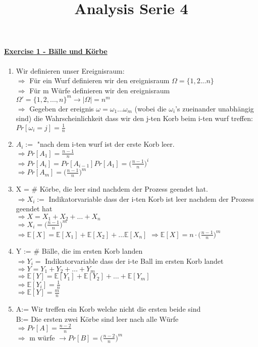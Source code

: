 \documentclass[8pt]{extreport}
\title{Analysis Serie 4}
\begin{document}
\paragraph{\underline{Exercise 1 - Bälle und Körbe}}
\begin{enumerate}[label = (\alph*)]
\item Wir definieren unser Ereignisraum:\\
$\Rightarrow$ Für ein Wurf definieren wir den ereignisraum $\Omega = \{1,2...n\}$\\
$\Rightarrow$ Für m Würfe definieren wir den ereignisraum $\Omega' = \{1,2,...,n\}^m \rightarrow |\Omega| = n^m$\\
$\Rightarrow$ Gegeben der ereignis $\omega = \omega_1\dots \omega_m$ (wobei die $\omega_i$'s zueinander unabhängig sind) die Wahrscheinlichkeit dass wir den j-ten Korb beim i-ten wurf treffen:\\ $Pr[\omega_i = j] = \frac{1}{n}$
\item $A_i:=$ "nach dem i-ten wurf ist der erste Korb leer.\\
$\Rightarrow Pr[A_1] = \frac{n-1}{n}$\\
$\Rightarrow Pr[A_i] = Pr[A_{i-1}] Pr[A_1] = \big(\frac{n-1}{n}\big)^i$\\
$\Rightarrow Pr[A_m] = \big(\frac{n-1}{n}\big)^m$
\item X = $\#$ Körbe, die leer sind nachdem der Prozess geendet hat.\\
$\Rightarrow X_i:=$ Indikatorvariable dass der i-ten Korb ist leer nachdem der Prozess geendet hat\\
$\Rightarrow X = X_1 + X_2 + \dots + X_n$\\
$\Rightarrow X_i = \big(\frac{n-1}{n}\big)^m$\\
$\Rightarrow \mathbb{E}[X] = \mathbb{E}[X_1] + \mathbb{E}[X_2] + \dots \mathbb{E}[X_n]$
$\Rightarrow \mathbb{E}[X] = n \cdot \big(\frac{n-1}{n}\big)^m$
\item Y := $\#$ Bälle, die im ersten Korb landen\\
$\Rightarrow Y_i = $ Indikatorvariable dass der i-te Ball im ersten Korb landet\\
$\Rightarrow Y = Y_1 + Y_2 + \dots + Y_m$\\
$\Rightarrow \mathbb{E}[Y] = \mathbb{E}[Y_1] + \mathbb{E}[Y_2] + \dots + \mathbb{E}[Y_m]$\\
$\Rightarrow \mathbb{E}[Y_i] =\frac{1}{n}$\\
$\Rightarrow \mathbb{E}[Y] = \frac{m}{n}$\\
\item A:= Wir treffen ein Korb welche nicht die ersten beide sind\\ B:= Die ersten zwei Körbe sind leer nach alle Würfe\\
$\Rightarrow Pr[A] = \frac{n-2}{n}$ \\
$\Rightarrow$ m würfe $\rightarrow Pr[B] = \big(\frac{n-2}{n}\big)^m$
\end{enumerate}
\end{document}
